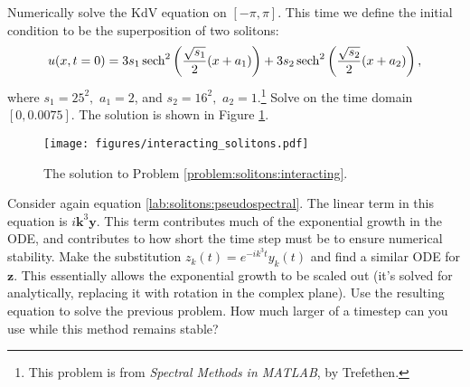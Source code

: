 \begin{problem}
Numerically solve the KdV equation on $[-\pi,\pi]$.
This time we define the initial condition 
to be the superposition of two solitons:
\[
u(x,t=0) = 3s_1\operatorname{sech}^2\left(\frac{\sqrt{s_1}}{2}(x+a_1)\right) + 3s_2\operatorname{sech}^2\left(\frac{\sqrt{s_2}}{2}(x+a_2)\right),
\]
where $s_1 = 25^2,$ $a_1 = 2$, and $s_2 = 16^2,$ $a_2 = 1$.\footnote{This problem is from \textit{Spectral Methods in MATLAB}, by Trefethen.}
Solve on the time domain $[0,0.0075]$.
The solution is shown in Figure \ref{fig:solitons:interacting}.
\label{problem:solitons:interacting}
\end{problem}

\begin{figure}[H]
\centering
\texttt{[image: figures/interacting\_solitons.pdf]}
\caption{The solution to Problem \ref{problem:solitons:interacting}.}
\label{fig:solitons:interacting}
\end{figure}

\begin{problem}
Consider again equation \eqref{lab:solitons:pseudospectral}.
The linear term in this equation is $i\mathbf{k}^3\mathbf{y}$.
This term contributes much of the exponential growth in the ODE, and contributes to how short the time step must be to ensure numerical stability.
Make the substitution $z_k(t) = e^{-ik^3t}y_k(t)$ and find a similar ODE for $\mathbf{z}$.
This essentially allows the exponential growth to be scaled out (it's solved for analytically, replacing it with rotation in the complex plane).
Use the resulting equation to solve the previous problem.
How much larger of a timestep can you use while this method remains stable?
\end{problem}